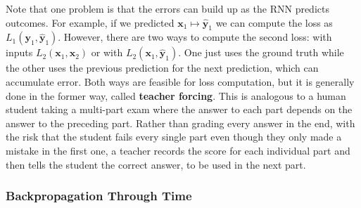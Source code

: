 \documentclass{article}
\begin{document}
\begin{figure}[H]
      \caption{} 
      \label{fig:rnn_w_loss}
    \end{figure}

    Note that one problem is that the errors can build up as the RNN predicts outcomes. For example, if we predicted $\mathbf{x}_1 \mapsto \hat{\mathbf{y}}_1$ we can compute the loss as $L_1 (\mathbf{y}_1, \hat{\mathbf{y}}_1)$. However, there are two ways to compute the second loss: with inputs $L_2 (\mathbf{x}_1, \mathbf{x}_2)$ or with $L_2 (\mathbf{x}_1, \hat{\mathbf{y}}_1)$. One just uses the ground truth while the other uses the previous prediction for the next prediction, which can accumulate error. Both ways are feasible for loss computation, but it is generally done in the former way, called \textbf{teacher forcing}. This is analogous to a human student taking a multi-part exam where the answer to each part depends on the answer to the preceding part. Rather than grading every answer in the end, with the risk that the student fails every single part even though they only made a mistake in the first one, a teacher records the score for each individual part and then tells the student the correct answer, to be used in the next part. 

  \subsubsection{Backpropagation Through Time}
\end{document}

